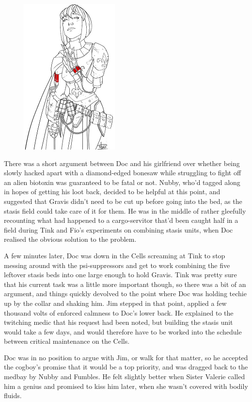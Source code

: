\begin{figure}
	\begin{center}
		\includegraphics[width=\figwidth]{pics/15/33.png}
	\end{center}
\end{figure}
There was a short argument between Doc and his girlfriend over whether being slowly hacked apart with a diamond-edged bonesaw while struggling to fight off an alien biotoxin was guaranteed to be fatal or not. 
Nubby, who'd tagged along in hopes of getting his loot back, decided to be helpful at this point, and suggested that Gravis didn't need to be cut up before going into the bed, as the stasis field could take care of it for them. 
He was in the middle of rather gleefully recounting what had happened to a cargo-servitor that'd been caught half in a field during Tink and Fio's experiments on combining stasis units, when Doc realised the obvious solution to the problem.

A few minutes later, Doc was down in the Cells screaming at Tink to stop messing around with the psi-suppressors and get to work combining the five leftover stasis beds into one large enough to hold Gravis. 
Tink was pretty sure that his current task was a little more important though, so there was a bit of an argument, and things quickly devolved to the point where Doc was holding techie up by the collar and shaking him. 
Jim stepped in that point, applied a few thousand volts of enforced calmness to Doc's lower back. 
He explained to the twitching medic that his request had been noted, but building the stasis unit would take a few days, and would therefore have to be worked into the schedule between critical maintenance on the Cells.

Doc was in no position to argue with Jim, or walk for that matter, so he accepted the cogboy's promise that it would be a top priority, and was dragged back to the medbay by Nubby and Fumbles. 
He felt slightly better when Sister Valerie called him a genius and promised to kiss him later, when she wasn't covered with bodily fluids.


